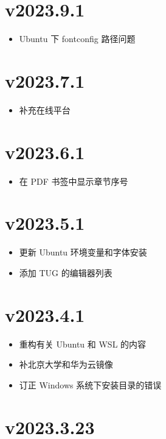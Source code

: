 \section*{v2023.9.1}

\begin{itemize}
  \item Ubuntu 下 fontconfig 路径问题
\end{itemize}

\section*{v2023.7.1}

\begin{itemize}
  \item 补充在线平台
\end{itemize}

\section*{v2023.6.1}

\begin{itemize}
  \item 在 PDF 书签中显示章节序号
\end{itemize}

\section*{v2023.5.1}

\begin{itemize}
  \item 更新 Ubuntu 环境变量和字体安装
  \item 添加 TUG 的编辑器列表
\end{itemize}

\section*{v2023.4.1}

\begin{itemize}
  \item 重构有关 Ubuntu 和 WSL 的内容
  \item 补北京大学和华为云镜像
  \item 订正 Windows 系统下安装目录的错误
\end{itemize}

\section*{v2023.3.23}

